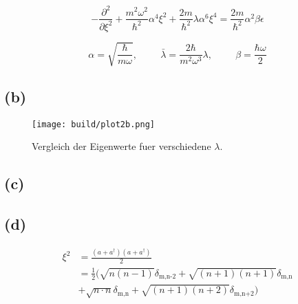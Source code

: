 \documentclass{scrartcl}
\begin{document}
\begin{equation}
		- \frac{\partial^2}{\partial \xi^2} + \frac{m^2
		\omega^2}{\hbar^2} \alpha^4 \xi^2 + \frac{2m}{\hbar^2} \lambda \alpha^6
		\xi^4 = \frac{2m}{\hbar^2} \alpha^2 \beta \epsilon
\end{equation}

\begin{equation}
		\alpha = \sqrt{\frac{\hbar}{m \omega}}, \hspace{1cm} \bar{\lambda} =
		\frac{2 \hbar}{m^2 \omega^3} \lambda, \hspace{1cm} \beta = \frac{\hbar
		\omega}{2}
\end{equation}
\subsection*{(b)}
\begin{figure}[ht]
		\centering
		\texttt{[image: build/plot2b.png]}
		\caption{Vergleich der Eigenwerte fuer verschiedene $\lambda$.}%
		\label{fig:2b}
\end{figure}

\subsection*{(c)}

\subsection*{(d)}
\begin{align}
		\xi^2 &= \frac{(a + a^\dagger)(a + a^\dagger)}{2} \\
			  &= \frac{1}{2} (
		\sqrt{n(n-1)} \delta_\text{m,n-2} + \sqrt{(n+1)(n+1)} \delta_\text{m,n} \\
		&+ \sqrt{n \cdot n} \delta_\text{m,n} +  \sqrt{(n+1)(n+2)}
		\delta_\text{m,n+2} )
\end{align}
\end{document}
